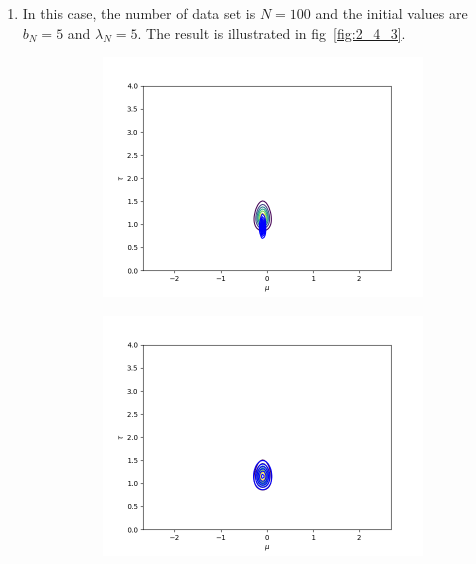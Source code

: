 \documentclass[11pt]{extarticle}
\newcommand{\0}{\mathbf{0}}
\renewcommand{\(}{\left(}
\renewcommand{\)}{\right)}
\theoremstyle{definition}
\begin{document}
\begin{enumerate}
	\item In this case, the number of data set is $N = 100$ and the initial values are $b_{N} = 5$ and $\lambda_{N} = 5$. The result is illustrated in fig~\ref{fig:2_4_3}.
	\begin{figure}[!ht]
		\centering
		\begin{subfigure}{.45\textwidth}
			\includegraphics[width=\linewidth]{2_4_3_1}
		\end{subfigure}
		\begin{subfigure}{.45\textwidth}
			\includegraphics[width=\linewidth]{2_4_3_2}
		\end{subfigure}
		\begin{subfigure}{.45\textwidth}

\end{subfigure}
\end{figure}
\end{enumerate}
\end{document}
